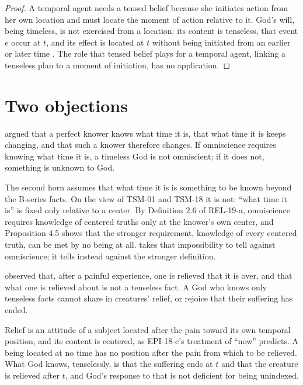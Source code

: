 \documentclass{situationist-preprint}
\begin{document}
\begin{proof}
A temporal agent needs a tensed belief because she initiates action from her own location and must locate the moment of action relative to it. God's will, being timeless, is not exercised from a location: its content is tenseless, that event $e$ occur at $t$, and its effect is located at $t$ without being initiated from an earlier or later time \citep{StumpKretzmann1981}. The role that tensed belief plays for a temporal agent, linking a tenseless plan to a moment of initiation, has no application.
\end{proof}

\section{Two objections}

\begin{objection}
\citet{Kretzmann1966} argued that a perfect knower knows what time it is, that what time it is keeps changing, and that such a knower therefore changes. If omniscience requires knowing what time it is, a timeless God is not omniscient; if it does not, something is unknown to God.
\end{objection}

\begin{reply}
The second horn assumes that what time it is is something to be known beyond the B-series facts. On the view of TSM-01 and TSM-18 it is not: \enquote{what time it is} is fixed only relative to a center. By Definition 2.6 of REL-19-a, omniscience requires knowledge of centered truths only at the knower's own center, and Proposition 4.5 shows that the stronger requirement, knowledge of every centered truth, can be met by no being at all. \citet{Grim1985} takes that impossibility to tell against omniscience; it tells instead against the stronger definition.
\end{reply}

\begin{objection}
\citet{Prior1959} observed that, after a painful experience, one is relieved that it is over, and that what one is relieved about is not a tenseless fact. A God who knows only tenseless facts cannot share in creatures' relief, or rejoice that their suffering has ended.
\end{objection}

\begin{reply}
Relief is an attitude of a subject located after the pain toward its own temporal position, and its content is centered, as EPI-18-c's treatment of \enquote{now} predicts. A being located at no time has no position after the pain from which to be relieved. What God knows, tenselessly, is that the suffering ends at $t$ and that the creature is relieved after $t$, and God's response to that is not deficient for being unindexed.
\end{reply}
\end{document}
